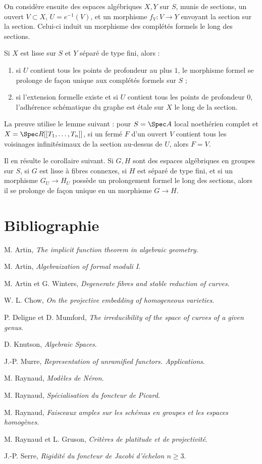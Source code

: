 On considère ensuite des espaces algébriques $X,Y$ sur $S$, munis de sections, un ouvert $V\subset X$, $U=e^{-1}(V)$, et un morphisme $f_V:V\to Y$ envoyant la section sur la section. Celui-ci induit un morphisme des complétés formels le long des sections.

Si $X$ est lisse sur $S$ et $Y$ séparé de type fini, alors :
\begin{enumerate}[label=(\roman*)]
\item si $U$ contient tous les points de profondeur au plus $1$, le morphisme formel se prolonge de façon unique aux complétés formels sur $S$ ;
\item si l'extension formelle existe et si $U$ contient tous les points de profondeur $0$, l'adhérence schématique du graphe est étale sur $X$ le long de la section.
\end{enumerate}
La preuve utilise le lemme suivant : pour $S=\Spec A$ local noethérien complet et $X=\Spec R[[T_1,\ldots,T_n]]$, si un fermé $F$ d'un ouvert $V$ contient tous les voisinages infinitésimaux de la section au-dessus de $U$, alors $F=V$.

Il en résulte le corollaire suivant. Si $G,H$ sont des espaces algébriques en groupes sur $S$, si $G$ est lisse à fibres connexes, si $H$ est séparé de type fini, et si un morphisme $G_U\to H_U$ possède un prolongement formel le long des sections, alors il se prolonge de façon unique en un morphisme $G\to H$.

\section*{Bibliographie}
\begin{enumerate}[label={[\arabic*]}]
\item M. Artin, \emph{The implicit function theorem in algebraic geometry}.
\item M. Artin, \emph{Algebraization of formal moduli I}.
\item M. Artin et G. Winters, \emph{Degenerate fibres and stable reduction of curves}.
\item W. L. Chow, \emph{On the projective embedding of homogeneous varieties}.
\item P. Deligne et D. Mumford, \emph{The irreducibility of the space of curves of a given genus}.
\item D. Knutson, \emph{Algebraic Spaces}.
\item J.-P. Murre, \emph{Representation of unramified functors. Applications}.
\item M. Raynaud, \emph{Modèles de Néron}.
\item M. Raynaud, \emph{Spécialisation du foncteur de Picard}.
\item M. Raynaud, \emph{Faisceaux amples sur les schémas en groupes et les espaces homogènes}.
\item M. Raynaud et L. Gruson, \emph{Critères de platitude et de projectivité}.
\item J.-P. Serre, \emph{Rigidité du foncteur de Jacobi d'échelon $n\ge3$}.
\end{enumerate}


